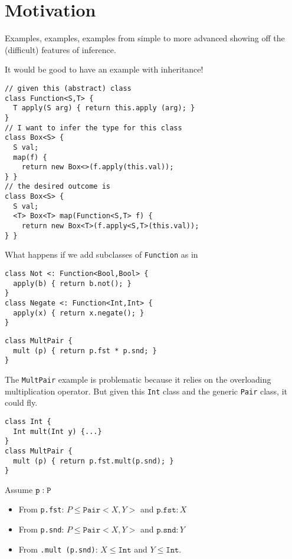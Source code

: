 \section{Motivation}
\label{sec:motivation}

Examples, examples, examples from simple to more advanced showing off
the (difficult) features of inference.

It would be good to have an example with inheritance!

\begin{lstlisting}
// given this (abstract) class
class Function<S,T> {
  T apply(S arg) { return this.apply (arg); }
}
// I want to infer the type for this class
class Box<S> {
  S val;
  map(f) {
    return new Box<>(f.apply(this.val));
} }
// the desired outcome is
class Box<S> {
  S val;
  <T> Box<T> map(Function<S,T> f) {
    return new Box<T>(f.apply<S,T>(this.val));
} }
\end{lstlisting}
What happens if we add subclasses of \texttt{Function} as in
\begin{lstlisting}
class Not <: Function<Bool,Bool> {
  apply(b) { return b.not(); }
}
class Negate <: Function<Int,Int> {
  apply(x) { return x.negate(); }
}
\end{lstlisting}

\begin{lstlisting}
class MultPair {
  mult (p) { return p.fst * p.snd; }
}
\end{lstlisting}
The \texttt{MultPair} example is problematic because it relies on the overloading
multiplication operator. But given this \texttt{Int} class and the
generic \texttt{Pair} class, it could fly.
\begin{lstlisting}
class Int {
  Int mult(Int y) {...}
}
class MultPair {
  mult (p) { return p.fst.mult(p.snd); }
}
\end{lstlisting}
Assume $\tt p:P$
\begin{itemize}
\item From \texttt{p.fst}: $P \le \mathtt{Pair}<X,Y>$ and
  $\texttt{p.fst} : X$
\item From \texttt{p.snd}: $P \le \mathtt{Pair}<X,Y>$ and
  $\texttt{p.snd} : Y$
\item From \texttt{.mult (p.snd)}: $X \le \mathtt{Int}$ and $Y \le \mathtt{Int}$.
\end{itemize}
